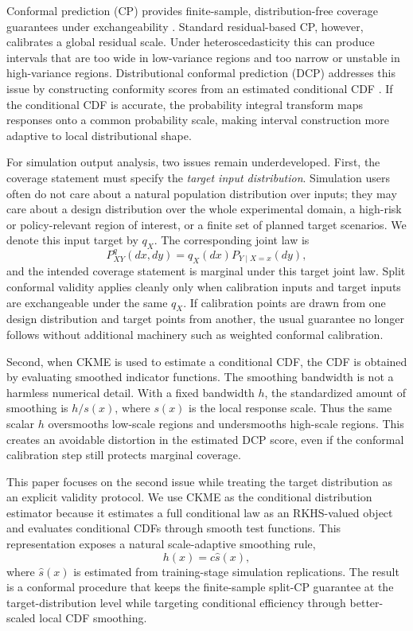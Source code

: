\documentclass[11pt]{article}
\begin{document}
Conformal prediction (CP) provides finite-sample, distribution-free coverage guarantees under exchangeability \cite{vovk2005,shafer2008,lei2018,angelopoulos2023}. Standard residual-based CP, however, calibrates a global residual scale. Under heteroscedasticity this can produce intervals that are too wide in low-variance regions and too narrow or unstable in high-variance regions. Distributional conformal prediction (DCP) addresses this issue by constructing conformity scores from an estimated conditional CDF \cite{chernozhukov2021}. If the conditional CDF is accurate, the probability integral transform maps responses onto a common probability scale, making interval construction more adaptive to local distributional shape.

For simulation output analysis, two issues remain underdeveloped. First, the coverage statement must specify the \emph{target input distribution}. Simulation users often do not care about a natural population distribution over inputs; they may care about a design distribution over the whole experimental domain, a high-risk or policy-relevant region of interest, or a finite set of planned target scenarios. We denote this input target by \(q_X\). The corresponding joint law is
\[
  P^q_{XY}(dx,dy)=q_X(dx)P_{Y\mid X=x}(dy),
\]
and the intended coverage statement is marginal under this target joint law. Split conformal validity applies cleanly only when calibration inputs and target inputs are exchangeable under the same \(q_X\). If calibration points are drawn from one design distribution and target points from another, the usual guarantee no longer follows without additional machinery such as weighted conformal calibration.

Second, when CKME is used to estimate a conditional CDF, the CDF is obtained by evaluating smoothed indicator functions. The smoothing bandwidth is not a harmless numerical detail. With a fixed bandwidth \(h\), the standardized amount of smoothing is \(h/s(x)\), where \(s(x)\) is the local response scale. Thus the same scalar \(h\) oversmooths low-scale regions and undersmooths high-scale regions. This creates an avoidable distortion in the estimated DCP score, even if the conformal calibration step still protects marginal coverage.

This paper focuses on the second issue while treating the target distribution as an explicit validity protocol. We use CKME as the conditional distribution estimator because it estimates a full conditional law as an RKHS-valued object and evaluates conditional CDFs through smooth test functions. This representation exposes a natural scale-adaptive smoothing rule,
\[
  h(x)=c\widehat s(x),
\]
where \(\widehat s(x)\) is estimated from training-stage simulation replications. The result is a conformal procedure that keeps the finite-sample split-CP guarantee at the target-distribution level while targeting conditional efficiency through better-scaled local CDF smoothing.
\end{document}
